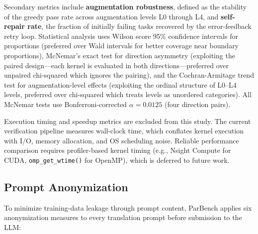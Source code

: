 \documentclass{article}
\begin{document}
Secondary metrics include \textbf{augmentation robustness}, defined as the stability of the greedy pass rate across augmentation levels L0 through L4, and \textbf{self-repair rate}, the fraction of initially failing tasks recovered by the error-feedback retry loop.
Statistical analysis uses Wilson score 95\% confidence intervals for proportions (preferred over Wald intervals for better coverage near boundary proportions), McNemar's exact test for direction asymmetry (exploiting the paired design---each kernel is evaluated in both directions---preferred over unpaired chi-squared which ignores the pairing), and the Cochran-Armitage trend test for augmentation-level effects (exploiting the ordinal structure of L0--L4 levels, preferred over chi-squared which treats levels as unordered categories). All McNemar tests use Bonferroni-corrected $\alpha = 0.0125$ (four direction pairs).

Execution timing and speedup metrics are excluded from this study. The current verification pipeline measures wall-clock time, which conflates kernel execution with I/O, memory allocation, and OS scheduling noise. Reliable performance comparison requires profiler-based kernel timing (e.g., Nsight Compute for CUDA, \texttt{omp\_get\_wtime()} for OpenMP), which is deferred to future work.

\subsection{Prompt Anonymization}
\label{sec:anonymization}

To minimize training-data leakage through prompt content, ParBench applies six anonymization measures to every translation prompt before submission to the LLM:
\end{document}
